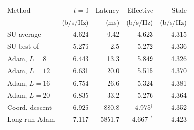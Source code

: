 \begin{tabular}{lrrrr}
\toprule
Method & $t{=}0$ & Latency & Effective & Stale \\
 & (b/s/Hz) & (ms) & (b/s/Hz) & (b/s/Hz) \\
\midrule
SU-average & 4.624 & 0.42 & 4.623 & 4.315 \\
SU-best-of & 5.276 & 2.5 & 5.272 & 4.336 \\
Adam, $L=8$ & 6.443 & 13.3 & 5.849 & 4.326 \\
Adam, $L=12$ & 6.631 & 20.0 & 5.515 & 4.370 \\
Adam, $L=16$ & 6.754 & 26.6 & 5.324 & 4.381 \\
Adam, $L=20$ & 6.835 & 33.2 & 5.276 & 4.364 \\
Coord. descent & 6.925 & 880.8 & 4.975$^\dagger$ & 4.352 \\
Long-run Adam & 7.117 & 5851.7 & 4.667$^\dagger$$^\ast$ & 4.423 \\
\bottomrule
\end{tabular}
